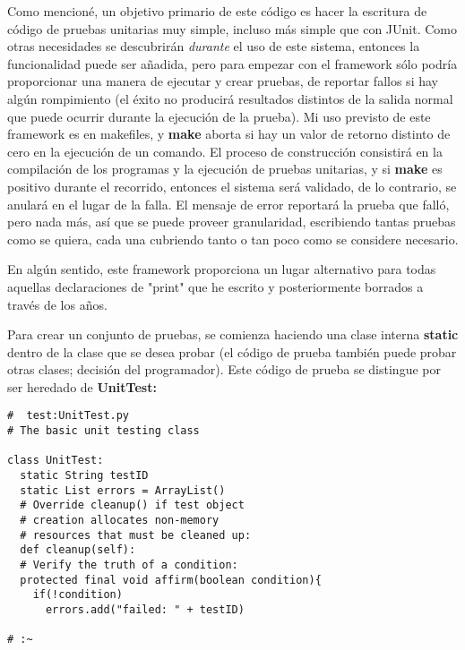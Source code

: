 Como mencioné, un objetivo primario de este código es hacer la escritura de código de pruebas unitarias muy simple, incluso más simple que con JUnit. Como otras necesidades se descubrirán \textit{durante} el uso de este sistema, entonces la funcionalidad puede ser añadida, pero para empezar con el framework sólo podría proporcionar una manera de ejecutar y crear pruebas, de reportar fallos si hay algún rompimiento (el éxito no producirá resultados distintos de la salida normal que puede ocurrir durante la ejecución de la prueba). Mi uso previsto de este framework es en makefiles, y \textbf{make} aborta si hay un valor de retorno distinto de cero en la ejecución de un comando. El proceso de construcción consistirá en la compilación de los programas y la ejecución de pruebas unitarias, y si \textbf{make} es positivo durante el recorrido, entonces el sistema será validado, de lo contrario, se anulará en el lugar de la falla. El mensaje de error reportará la prueba que falló, pero nada más, así que se puede proveer granularidad, escribiendo tantas pruebas como se quiera, cada una cubriendo tanto o tan poco como se considere necesario.     \newline

En algún sentido, este framework proporciona un lugar alternativo para todas aquellas declaraciones de "print" que he escrito y posteriormente borrados a través de los años.     \newline

Para crear un conjunto de pruebas, se comienza haciendo una clase interna \textbf{static} dentro de la clase que se desea probar (el código de prueba también puede probar otras clases; decisión del programador). Este código de prueba se distingue por ser heredado de \textbf{UnitTest:}   \newline

 \begin{lstlisting}
#  test:UnitTest.py 
# The basic unit testing class 

class UnitTest:  
  static String testID 
  static List errors = ArrayList() 
  # Override cleanup() if test object  
  # creation allocates non-memory  
  # resources that must be cleaned up: 
  def cleanup(self): 
  # Verify the truth of a condition: 
  protected final void affirm(boolean condition){ 
    if(!condition) 
      errors.add("failed: " + testID) 
      
# :~ 
\end{lstlisting}

